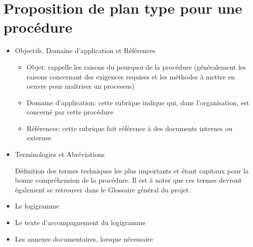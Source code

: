 \documentclass[a4paper]{article}
\begin{document}
\section{Proposition de plan type pour une procédure}

\begin{itemize}
\item Objectifs, Domaine d'application et Références

\begin{itemize}
\item Objet: rappelle les raisons du pourquoi de la procédure (généralement les raisons concernant des exigences requises et les méthodes à mettre en oeuvre pour maîtriser un processus)
\item Domaine d'application: cette rubrique indique qui, dans l'organisation, est concerné par cette procédure
\item Références: cette rubrique fait référence à des documents internes ou externes
\end{itemize}

\item Terminologies et Abréviations

Définition des termes techniques les plus importants et étant capitaux pour la bonne compréhension de la procédure. Il est à noter que ces termes devront également se retrouver dans le Glossaire général du projet.

\item Le logigramme
\item Le texte d'accompagnement du logigramme
\item Les annexes documentaires, lorsque nécessaire
\end{itemize}
\end{document}
